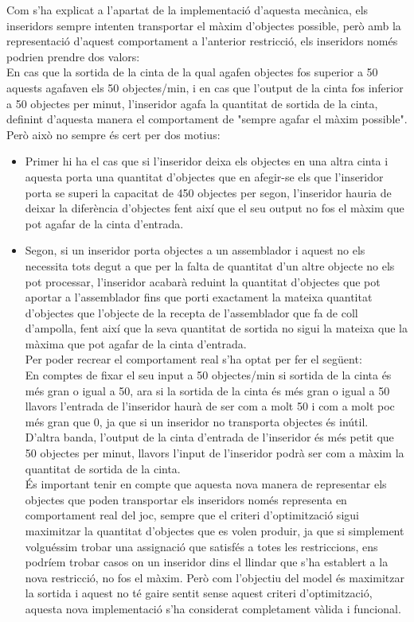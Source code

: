 Com s'ha explicat a l'apartat de la implementació d'aquesta mecànica, els inseridors sempre intenten transportar el màxim d'objectes possible, però amb la representació d'aquest comportament a l'anterior restricció, els inseridors només podrien prendre dos valors:\\
En cas que la sortida de la cinta de la qual agafen objectes fos superior a 50 aquests agafaven els 50 objectes/min, i en cas que l'output de la cinta fos inferior a 50 objectes per minut, l'inseridor agafa la quantitat de sortida de la cinta, definint d'aquesta manera el comportament de "sempre agafar el màxim possible". Però això no sempre és cert per dos motius:\\
\begin{itemize}
    \item Primer hi ha el cas que si l'inseridor deixa els objectes en una altra cinta i aquesta porta una quantitat d'objectes que en afegir-se els que l'inseridor porta se superi la capacitat de 450 objectes per segon, l'inseridor hauria de deixar la diferència d'objectes fent així que el seu output no fos el màxim que pot agafar de la cinta d'entrada.\\
    \item Segon, si un inseridor porta objectes a un assemblador i aquest no els necessita tots degut a que per la falta de quantitat d'un altre objecte no els pot processar, l'inseridor acabarà reduint la quantitat d'objectes que pot aportar a l'assemblador fins que porti exactament la mateixa quantitat d'objectes que l'objecte de la recepta de l'assemblador que fa de coll d'ampolla, fent així que la seva quantitat de sortida no sigui la mateixa que la màxima que pot agafar de la cinta d'entrada.\\

    Per poder recrear el comportament real s'ha optat per fer el següent:\\
    En comptes de fixar el seu input a 50 objectes/min si sortida de la cinta és més gran o igual a 50, ara si la sortida de la cinta és més gran o igual a 50 llavors l'entrada de l'inseridor haurà de ser com a molt 50 i com a molt poc més gran que 0, ja que si un inseridor no transporta objectes és inútil.\\

    D'altra banda, l'output de la cinta d'entrada de l'inseridor és més petit que 50 objectes per minut, llavors l'input de l'inseridor podrà ser com a màxim la quantitat de sortida de la cinta.\\
    És important tenir en compte que aquesta nova manera de representar els objectes que poden transportar els inseridors només representa en comportament real del joc, sempre que el criteri d'optimització sigui maximitzar la quantitat d'objectes que es volen produir, ja que si simplement volguéssim trobar una assignació que satisfés a totes les restriccions, ens podríem trobar casos on un inseridor dins el llindar que s'ha establert a la nova restricció, no fos el màxim. Però com l'objectiu del model és maximitzar la sortida i aquest no té gaire sentit sense aquest criteri d'optimització, aquesta nova implementació s'ha considerat completament vàlida i funcional.\\
\end{itemize}


